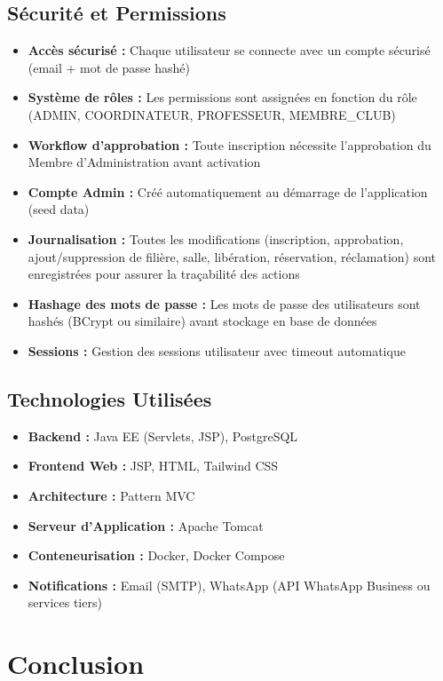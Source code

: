 \documentclass[12pt,a4paper]{article}
\begin{document}
\subsection{Sécurité et Permissions}
\begin{itemize}
    \item \textbf{Accès sécurisé :} Chaque utilisateur se connecte avec un compte sécurisé (email + mot de passe hashé)
    \item \textbf{Système de rôles :} Les permissions sont assignées en fonction du rôle (ADMIN, COORDINATEUR, PROFESSEUR, MEMBRE\_CLUB)
    \item \textbf{Workflow d'approbation :} Toute inscription nécessite l'approbation du Membre d'Administration avant activation
    \item \textbf{Compte Admin :} Créé automatiquement au démarrage de l'application (seed data)
    \item \textbf{Journalisation :} Toutes les modifications (inscription, approbation, ajout/suppression de filière, salle, libération, réservation, réclamation) sont enregistrées pour assurer la traçabilité des actions
    \item \textbf{Hashage des mots de passe :} Les mots de passe des utilisateurs sont hashés (BCrypt ou similaire) avant stockage en base de données
    \item \textbf{Sessions :} Gestion des sessions utilisateur avec timeout automatique
\end{itemize}

\subsection{Technologies Utilisées}

\begin{itemize}
    \item \textbf{Backend :} Java EE (Servlets, JSP), PostgreSQL
    \item \textbf{Frontend Web :} JSP, HTML, Tailwind CSS
    \item \textbf{Architecture :} Pattern MVC
    \item \textbf{Serveur d'Application :} Apache Tomcat
    \item \textbf{Conteneurisation :} Docker, Docker Compose
    \item \textbf{Notifications :} Email (SMTP), WhatsApp (API WhatsApp Business ou services tiers)
\end{itemize}

\section{Conclusion}
\end{document}
